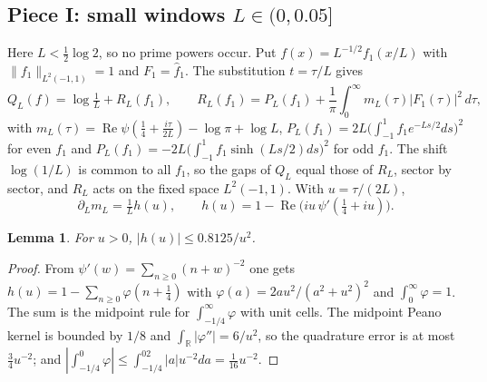 \documentclass[11pt]{amsart}
\newcommand{\R}{\mathbb{R}}
\newcommand{\re}{\operatorname{Re}}
\newtheorem{lemma}[theorem]{Lemma}
\theoremstyle{definition}
\theoremstyle{remark}
\numberwithin{equation}{section}
\begin{document}
\subsection{Piece I: small windows $L\in(0,0.05]$}\label{sec:piece1}
Here $L<\tfrac12\log2$, so no prime powers occur. Put $f(x)=L^{-1/2}f_1(x/L)$ with $\|f_1\|_{L^2(-1,1)}=1$ and $F_1=\hat f_1$. The substitution $t=\tau/L$ gives
\[
Q_L(f)=\log\tfrac1L+R_L(f_1),\qquad R_L(f_1)=P_L(f_1)+\frac1\pi\int_0^\infty m_L(\tau)|F_1(\tau)|^2\,d\tau,
\]
with $m_L(\tau)=\re\psi(\tfrac14+\tfrac{i\tau}{2L})-\log\pi+\log L$, $P_L(f_1)=2L\bigl(\int_{-1}^1f_1e^{-Ls/2}ds\bigr)^2$ for even $f_1$ and $P_L(f_1)=-2L\bigl(\int_{-1}^1f_1\sinh(Ls/2)ds\bigr)^2$ for odd $f_1$. The shift $\log(1/L)$ is common to all $f_1$, so the gaps of $Q_L$ equal those of $R_L$, sector by sector, and $R_L$ acts on the fixed space $L^2(-1,1)$. With $u=\tau/(2L)$,
\[
\partial_Lm_L=\tfrac1L h(u),\qquad h(u)=1-\re\bigl(iu\,\psi'(\tfrac14+iu)\bigr).
\]

\begin{lemma}\label{lem:h}
For $u>0$, $|h(u)|\le0.8125/u^2$.
\end{lemma}
\begin{proof}
From $\psi'(w)=\sum_{n\ge0}(n+w)^{-2}$ one gets $h(u)=1-\sum_{n\ge0}\varphi(n+\tfrac14)$ with $\varphi(a)=2au^2/(a^2+u^2)^2$ and $\int_0^\infty\varphi=1$. The sum is the midpoint rule for $\int_{-1/4}^\infty\varphi$ with unit cells. The midpoint Peano kernel is bounded by $1/8$ and $\int_\R|\varphi''|=6/u^2$, so the quadrature error is at most $\tfrac34u^{-2}$; and $|\int_{-1/4}^0\varphi|\le\int_{-1/4}^02|a|u^{-2}da=\tfrac1{16}u^{-2}$.
\end{proof}
\end{document}
